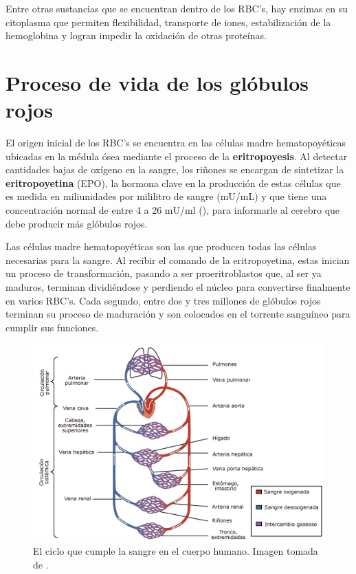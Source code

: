 Entre otras sustancias que se encuentran dentro de los RBC's, hay enzimas en su citoplasma que permiten flexibilidad, transporte de iones, estabilización de la hemoglobina y logran impedir la oxidación de otras proteínas.

\section{Proceso de vida de los glóbulos rojos}\label{sec:RBC:vida}

El origen inicial de los RBC's se encuentra en las células madre hematopoyéticas ubicadas en la médula ósea mediante el proceso de la \textbf{eritropoyesis}. Al detectar cantidades bajas de oxígeno en la sangre, los riñones se encargan de sintetizar la \textbf{eritropoyetina} (EPO), la hormona clave en la producción de estas células que es medida en miliunidades por mililitro de sangre (mU/mL) y que tiene una concentración normal de entre 4 a 26 mU/ml (\cite{Cleveland}), para informarle al cerebro que debe producir más glóbulos rojos. 

Las células madre hematopoyéticas son las que producen todas las células necesarias para la sangre. Al recibir el comando de la eritropoyetina, estas inician un proceso de transformación, pasando a ser proeritroblastos que, al ser ya maduros, terminan dividiéndose y perdiendo el núcleo para convertirse finalmente en varios RBC's. Cada segundo, entre dos y tres millones de glóbulos rojos terminan su proceso de maduración y son colocados en el torrente sanguíneo para cumplir sus funciones.

\begin{figure}[H]
    \centering
    \includegraphics[scale=0.2]{figures/CicloSangre.jpg}
    \caption{El ciclo que cumple la sangre en el cuerpo humano. Imagen tomada de \cite{eswiki:159489943}.}
    \label{sec:RBC:fig:CicloSangre}
\end{figure}

